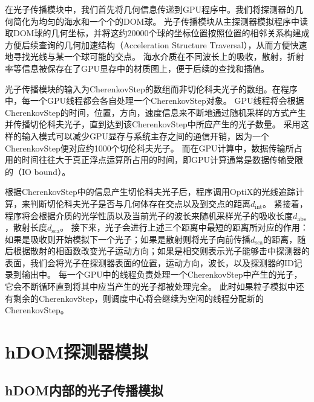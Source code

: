 在光子传播模块中，我们首先将几何信息传递到GPU程序中。我们将探测器的几何简化为均匀的海水和一个个的DOM球。
光子传播模块从主探测器模拟程序中读取DOM球的几何坐标，并将这约20000个球的坐标位置按照位置的相邻关系构建成方便后续查询的几何加速结构（Acceleration Structure Traversal），从而方便快速地寻找光线与某一个球可能的交点。
海水介质在不同波长上的吸收，散射，折射率等信息被保存在了GPU显存中的材质图上，便于后续的查找和插值。

光子传播模块的输入为\textsf{CherenkovStep}的数组而非切伦科夫光子的数组。在程序中，每一个GPU线程都会各自处理一个\textsf{CherenkovStep}对象。
GPU线程将会根据\textsf{CherenkovStep}的时间，位置，方向，速度信息来不断地通过随机采样的方式产生并传播切伦科夫光子，直到达到该\textsf{CherenkovStep}中所应产生的光子数量。
采用这样的输入模式可以减少GPU显存与系统主存之间的通信开销，因为一个\textsf{CherenkovStep}便对应约1000个切伦科夫光子。
而在GPU计算中，数据传输所占用的时间往往大于真正浮点运算所占用的时间，即GPU计算通常是数据传输受限的（IO bound）\cite{CUDA_for_engineers:2015}。

根据\textsf{CherenkovStep}中的信息产生切伦科夫光子后，程序调用OptiX的光线追踪计算，来判断切伦科夫光子是否与几何体存在交点以及到交点的距离$d_\mathrm{int}$。
紧接着，程序将会根据介质的光学性质以及当前光子的波长来随机采样光子的吸收长度$d_\mathrm{abs}$，散射长度$d_\mathrm{sca}$。
接下来，光子会进行上述三个距离中最短的距离所对应的作用：如果是吸收则开始模拟下一个光子；如果是散射则将光子向前传播$d_\mathrm{sca}$的距离，随后根据散射的相函数改变光子运动方向；如果是相交则表示光子能够击中探测器的表面，我们会将光子在探测器表面的位置，运动方向，波长，以及探测器的ID记录到输出中。
每一个GPU中的线程负责处理一个\textsf{CherenkovStep}中产生的光子，它会不断循环直到将其中应当产生的光子都被处理完全。
此时如果粒子模拟中还有剩余的\textsf{CherenkovStep}，则调度中心将会继续为空闲的线程分配新的\textsf{CherenkovStep}。



\section{hDOM探测器模拟}
\label{sec:hdom_sim}

\subsection{hDOM内部的光子传播模拟}
\label{subsec:hDOM_sim}

